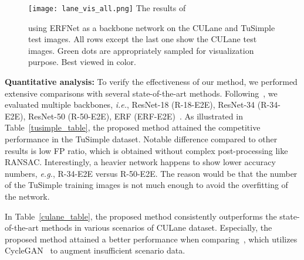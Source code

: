 \documentclass[10pt,twocolumn,letterpaper]{article}
\begin{document}
\begin{figure*}[t]
	\centering
	\texttt{[image: lane\_vis\_all.png]}
	The results of \caption{\textbf{\algorithmname} using ERFNet as a backbone network on the CULane and TuSimple test images. All rows except the last one show the CULane test images. Green dots are appropriately sampled for visualization purpose. Best viewed in color.}
	\label{fig:results_all}
	\vspace{1px}
\end{figure*}


\textbf{Quantitative analysis:} To verify the effectiveness of our method, we performed extensive comparisons with several state-of-the-art methods. Following~\cite{SAD}, we evaluated multiple backbones, \textit{i.e.}, ResNet-18 (R-18-E2E), ResNet-34 (R-34-E2E), ResNet-50 (R-50-E2E), ERF (ERF-E2E)~\cite{ERFNet}.  As illustrated in Table~\ref{tusimple_table}, the proposed method attained the competitive performance in the TuSimple dataset. Notable difference compared to other results is low FP ratio, which is obtained without complex post-processing like RANSAC. Interestingly, a heavier network happens to show lower accuracy numbers, \textit{e.g.}, R-34-E2E versus R-50-E2E. The reason would be that the number of the TuSimple training images is not much enough to avoid the overfitting of the network.

In Table~\ref{culane_table}, the proposed method consistently outperforms the state-of-the-art methods in various scenarios of CULane dataset. Especially, the proposed method attained a better performance when comparing~\cite{LaneGan}, which utilizes CycleGAN~\cite{cyclegan} to augment insufficient scenario data.
\end{document}
